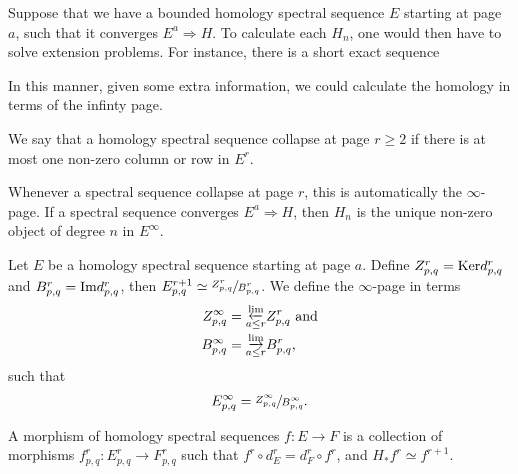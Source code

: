 \documentclass[../thesis.tex]{subfiles}
\begin{document}
        Suppose that we have a bounded homology spectral sequence $E$ starting at page $a$, such that it converges $E^a \Rightarrow H$. To calculate each $H_n$, one would then have to solve extension problems. For instance, there is a short exact sequence
        \begin{center}
        \end{center}
        In this manner, given some extra information, we could calculate the homology in terms of the infinty page.

        \begin{definition}[Collapse]
            We say that a homology spectral sequence collapse at page $r \geq 2$ if there is at most one non-zero column or row in $E^r$.
        \end{definition}

        Whenever a spectral sequence collapse at page $r$, this is automatically the $\infty$-page. If a spectral sequence converges $E^a \Rightarrow H$, then $H_n$ is the unique non-zero object of degree $n$ in $E^\infty$.

        \begin{definition}
            Let $E$ be a homology spectral sequence starting at page $a$. Define $Z^r_{p,q} = \tt{Ker}d^r_{p,q}$ and $B^r_{p,q} = \tt{Im}d^r_{p,q}$, then $E^{r+1}_{p,q} \simeq \sfrac{Z^r_{p,q}}{B^r_{p,q}}$. We define the $\infty$-page in terms
            \begin{align*}
                Z^\infty_{p,q} & = \substack{\varprojlim \\ a \leq r}Z^r_{p,q}\tt{ and} \\
                B^\infty_{p,q} & = \substack{\varinjlim \\ a \leq r}B^r_{p,q}\tt{,} \\
            \end{align*}
            such that
            \begin{align*}
                E^\infty_{p,q} = \sfrac{Z^\infty_{p,q}}{B^\infty_{p,q}}\tt{.}
            \end{align*}
        \end{definition}

        \begin{definition}
            A morphism of homology spectral sequences $f : E \rightarrow F$ is a collection of morphisms $f^r_{p,q} : E^r_{p,q} \rightarrow F^r_{p,q}$ such that $f^r\circ d^r_E = d^r_F \circ f^r$, and $H_*f^r \simeq f^{r+1}$.
        \end{definition}
\end{document}

